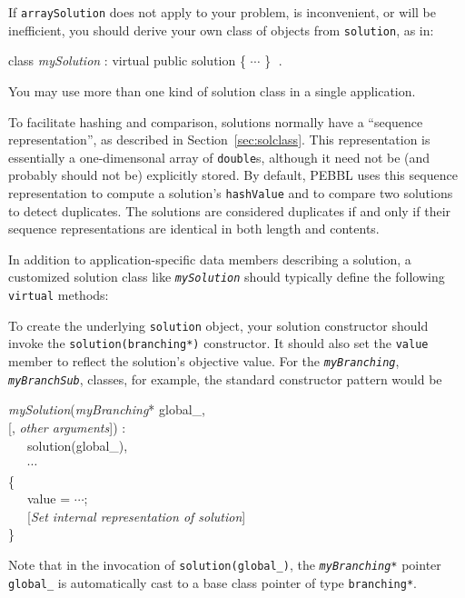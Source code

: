 If \texttt{arraySolution} does not apply to your problem, is
inconvenient, or will be inefficient, you should derive your own
class of objects from \texttt{solution}, as in:
\begin{codeblock}
class \emph{mySolution} : virtual public solution \{ $\cdots$ \}
$\;.$
\end{codeblock}
You may use more than one kind of solution class in a single
application.  

To facilitate hashing and comparison, solutions normally
have a ``sequence representation'', as described in
Section~\ref{sec:solclass}.  This representation is essentially a
one-dimensonal array of \texttt{double}s, although it need not be (and
probably should not be) explicitly stored.  By default, PEBBL uses
this sequence representation to compute a solution's
\texttt{hashValue} and to compare two solutions to detect duplicates.
The solutions are considered duplicates if and only if their sequence
representations are identical in both length and contents.

In addition to application-specific data members describing a
solution, a customized solution class like \texttt{\emph{mySolution}}
should typically define the following \texttt{virtual} methods:

\vspace{2ex}

To create the underlying \texttt{solution} object, your solution constructor
should invoke the \texttt{solution(branching*)} constructor.  It should also
set the \texttt{value} member to reflect the solution's objective
value.  For the \texttt{\emph{myBranching}},
\texttt{\emph{myBranchSub}}, classes, for example, the standard
constructor pattern would be
\begin{codeblock}
\emph{mySolution}(\=\emph{myBranching}* global\_, \\
                  \>\textrm{[}, \textrm{\emph{other arguments}]}) : \\
~~~solution(global\_), \\
~~~$\cdots$ \\
\{ \\
~~~value = $\cdots$; \\
~~~\textrm{[\emph{Set internal representation of solution}]} \\
\}
\end{codeblock}
Note that in the invocation of \texttt{solution(global\_)}, the
\texttt{\emph{myBranching*}} pointer \texttt{global\_} is
automatically cast to a base class pointer of type
\texttt{branching*}. 

